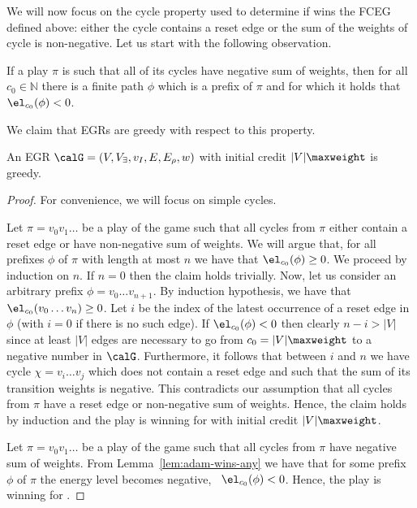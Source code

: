 \documentclass[a4paper]{article}
\begin{document}
We will now focus on the cycle property used to determine if \eve wins the FCEG
defined above: either the cycle contains a reset edge or the sum of the weights of
cycle is non-negative. Let us start with the following observation.
\begin{lemma}\label{lem:adam-wins-any}
	If a play $\pi$ is such that all of its cycles have negative sum of
	weights, then for all $c_0 \in \mathbb{N}$ there is a finite path $\phi$ which
	is a prefix of $\pi$ and for which it holds that $\el_{c_0}(\phi) < 0$.
\end{lemma}
We claim that EGRs are greedy with respect to
this property.
\begin{lemma}\label{lem:eg-greedy}
	An EGR $\calG = (V,V_\exists,v_I,E,E_\rho,w)$ with initial credit
	$|V|\maxweight$ is greedy.
\end{lemma}
\begin{proof}
	For convenience, we will focus on simple cycles.

	Let $\pi = v_0 v_1 \dots$ be a play of the game such that all cycles
	from $\pi$ either contain a reset edge or have non-negative sum of weights.
	We will argue that, for all prefixes $\phi$ of $\pi$ with length at
	most $n$ we have that $\el_{c_0}(\phi) \ge 0$. We proceed by induction on $n$.
	If $n = 0$ then the claim holds trivially. Now, let us consider an
	arbitrary prefix $\phi = v_0 \dots v_{n+1}$. By induction
	hypothesis, we have that $\el_{c_0}(v_0 \dots v_n) \ge 0$.  Let
	$i$ be the index of the latest occurrence of a reset edge in $\phi$ (with $i
	= 0$ if there is no such edge). If $\el_{c_0}(\phi) < 0$ then clearly
	$n - i > |V|$ since at least $|V|$ edges are necessary to go from
	$c_0 = |V|\maxweight$ to a negative number in $\calG$. Furthermore, it
	follows that between $i$ and $n$ we have cycle $\chi = v_i \dots
	v_j$ which does not contain a reset edge and such that the sum of
	its transition weights is negative. This contradicts our assumption that
	all cycles from $\pi$ have a reset edge or non-negative sum of weights.
	Hence, the claim holds by induction and the play is winning for \eve
	with initial credit $|V|\maxweight$.

	Let $\pi = v_0 v_1 \dots$ be a play of the game such that all cycles
	from $\pi$ have negative sum of weights. From
	Lemma~\ref{lem:adam-wins-any} we have that for some prefix $\phi$ of
	$\pi$ the energy level becomes negative, \ie~$\el_{c_0}(\phi) < 0$. Hence, the
	play is winning for \adam.	
\end{proof}
\end{document}
